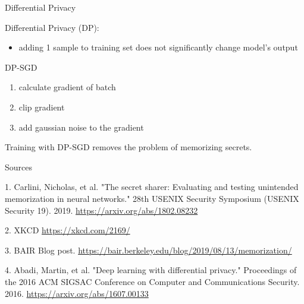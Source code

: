 \documentclass{beamer}
\begin{document}
\begin{frame}{Differential Privacy}

Differential Privacy (DP):
\begin{itemize}
\item adding 1 sample to training set does not significantly change model's output 
\end{itemize}

\vfill

DP-SGD \cite{dp}
\begin{enumerate}
\item calculate gradient of batch
\item clip gradient
\item add gaussian noise to the gradient
\end{enumerate}

\vfill

Training with DP-SGD removes the problem of memorizing secrets.

\end{frame}
\begin{frame}{Sources}
\begin{thebibliography}{0}

   1. Carlini, Nicholas, et al. "The secret sharer: Evaluating and testing unintended memorization in neural networks." 28th {USENIX} Security Symposium ({USENIX} Security 19). 2019. \url{https://arxiv.org/abs/1802.08232} 
  
   2. XKCD \url{https://xkcd.com/2169/}
  
   3. BAIR Blog post. \url{https://bair.berkeley.edu/blog/2019/08/13/memorization/}
  
   4. Abadi, Martin, et al. "Deep learning with differential privacy." Proceedings of the 2016 ACM SIGSAC Conference on Computer and Communications Security. 2016. \url{https://arxiv.org/abs/1607.00133}
  
\end{thebibliography}

\end{frame}

 
\end{document}
